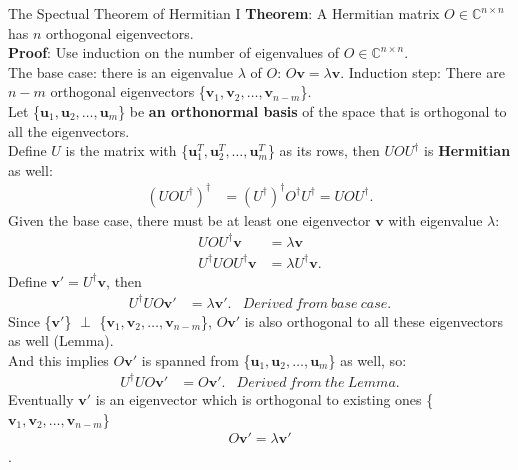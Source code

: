 \documentclass{beamer}
\begin{document}
\begin{frame}{The Spectual Theorem of Hermitian I\tiny{\cite{thespectraltheoremforhermitianmatrice}}}
  {\tiny
  \textbf{Theorem}: A Hermitian matrix $O \in \mathbb{C}^{n \times n}$  has $n$ orthogonal eigenvectors. \\
  \textbf{Proof}:
  Use induction on the number of eigenvalues of $O \in \mathbb{C}^{n \times n}$. \\
  The base case: there is an eigenvalue $\lambda$ of $O$: $O\mathbf{v} = \lambda \mathbf{v}$.
  Induction step:
  There are $n-m$ orthogonal eigenvectors \{$\mathbf{v}_1, \mathbf{v}_2, \dots, \mathbf{v}_{n-m}$\}. \\
  Let \{$\mathbf{u}_1, \mathbf{u}_2, \dots, \mathbf{u}_m$\} be \textbf{an orthonormal basis} of the space that is orthogonal to all the eigenvectors. \\
  Define $U$ is the matrix with \{$\mathbf{u}_1^T, \mathbf{u}_2^T, \dots, \mathbf{u}_m^T$\} as its rows,
  then $UOU^{\dagger}$ is \textbf{Hermitian} as well:
  \begin{align*}
  (UOU^{\dagger})^{\dagger} &= (U^{\dagger})^{\dagger} O^{\dagger} U^{\dagger} = UOU^{\dagger}.
  \end{align*}
  Given the base case, there must be at least one eigenvector $\mathbf{v}$ with eigenvalue $\lambda$:
  \begin{align*}
    UOU^{\dagger} \mathbf{v} &= \lambda \mathbf{v} \\
    U^{\dagger}UOU^{\dagger} \mathbf{v} &= \lambda U^{\dagger}\mathbf{v}.
  \end{align*}
  Define $\mathbf{v}' = U^{\dagger}\mathbf{v}$, then
  \begin{align*}
    U^{\dagger}U O \mathbf{v}' &= \lambda \mathbf{v}'. & Derived\ from\ base\ case.
  \end{align*}
  Since \{$\mathbf{v}'$\} $\perp$ \{$\mathbf{v}_1, \mathbf{v}_2, \dots, \mathbf{v}_{n-m}$\},
  $O\mathbf{v}'$ is also orthogonal to all these eigenvectors as well (Lemma). \\
  And this implies $O \mathbf{v}'$ is spanned from \{$\mathbf{u}_1, \mathbf{u}_2, \dots, \mathbf{u}_m$\} as well, so:
  \begin{align*}
    U^{\dagger}U O \mathbf{v}' &= O \mathbf{v}'. & Derived\ from\ the\ Lemma.
  \end{align*}
  Eventually $\mathbf{v}'$ is an eigenvector which is orthogonal to existing ones \{$\mathbf{v}_1, \mathbf{v}_2, \dots, \mathbf{v}_{n-m}$\}
  \begin{align*}
    O \mathbf{v}' = \lambda \mathbf{v}'
  \end{align*}.
  }%
\end{frame}
\end{document}
